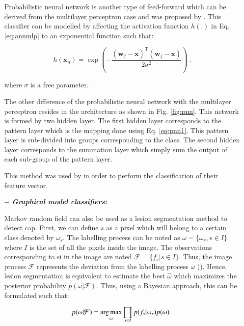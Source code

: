 \begin{enumerate}[leftmargin=*]
Probabilistic neural network is another type of feed-forward which can be derived from the multilayer perceptron case and was proposed by \cite{Specht1988}. This classifier can be modelled by affecting the activation function $h(.)$ in Eq. \ref{eq:annmlp} to an exponential function such that:

\begin{equation}
	h(\mathbf{x}_n) = \exp \left( - \frac{ (\mathbf{w}_j - \mathbf{x})^{\text{T}}(\mathbf{w}_j - \mathbf{x}) }{2\sigma^2} \right) \ .
	\label{eq:pnn1}
\end{equation}

\noindent where $\sigma$ is a free parameter.

The other difference of the probabilistic neural network with the multilayer perceptron resides in the architecture as shown in Fig. \ref{fig:pnn}. This network is formed by two hidden layer. The first hidden layer corresponds to the pattern layer which is the mapping done using Eq. \ref{eq:pnn1}. This pattern layer is sub-divided into groups corresponding to the class. The second hidden layer corresponds to the summation layer which simply sum the output of each sub-group of the pattern layer.

This method was used  by \cite{Ampeliotis2007,Ampeliotis2008,Viswanath2011} in order to perform the classification of their feature vector.

\item[$-$] \textbf{\textit{Graphical model classifiers:}}

Markov random field can also be used as a lesion segmentation method to detect \ac{cap}. First, we can define $s$ as a pixel which will belong to a certain class denoted by $\omega_s$. The labelling process can be noted as $\omega = \{\omega_s, s \in I\}$ where $I$ is the set of all the pixels inside the image. The observations corresponding to \ac{si} in the image are noted $\mathcal{F} = \{ f_s | s \in I \}$. Thus, the image process $\mathcal{F}$ represents the deviation from the labelling process $\omega$ (\cite{Kato2001}). Hence, lesion segmentation is equivalent to estimate the best $\hat{\omega}$ which maximizes the posterior probability $p(\omega|\mathcal{F})$. Thus, using a Bayesian approach, this can be formulated such that:

\begin{equation}
	p(\omega|\mathcal{F}) = \operatorname*{arg\,max}_{\omega} \prod_{s \in I} p(f_s | \omega_s) p(\omega) \ .
	\label{eq:mrf1}
\end{equation}


\end{enumerate}
